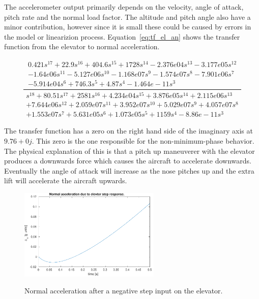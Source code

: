 The accelerometer output primarily depends on the velocity, angle of attack, pitch rate and the normal load factor. The altitude and pitch angle also have a minor contribution, however since it is small these could be caused by errors in the model or linearizion process. Equation~\ref{eq:tf_el_an} shows the transfer function from the elevator to normal acceleration.

\begin{equation}
    \label{eq:tf_el_an}
    \frac{
    \begin{matrix}
        0.421 s^{17} + 22.9 s^{16} + 404.6 s^{15} + 1728 s^{14} - 2.376e04 s^{13} - 3.177e05 s^{12} \\
        - 1.64e06 s^{11} - 5.127e06 s^{10} - 1.168e07 s^{9} - 1.574e07 s^{8} - 7.901e06 s^{7} \\
        - 5.914e04 s^{6} +  746.3 s^{5} + 4.87 s^{4} - 1.464e-11 s^{3}
    \end{matrix}
    }{
    \begin{matrix}
        s^{18} + 80.51 s^{17} + 2581 s^{16} + 4.234e04 s^{15} + 3.876e05 s^{14} + 2.115e06 s^{13} \\
        + 7.644e06 s^{12} + 2.059e07 s^{11} + 3.952e07 s^{10} + 5.029e07 s^{9} + 4.057e07 s^{8} \\
        + 1.553e07 s^{7} + 5.631e05 s^{6} + 1.073e05 s^{5} + 1159 s^{4} - 8.86e-11 s^{3}
    \end{matrix}
    }
\end{equation}

The transfer function has a zero on the right hand side of the imaginary axis at $9.76+0j$. This zero is the one responsible for the non-minimum-phase behavior. The physical explanation of this is that a pitch up maneuverer with the elevator produces a downwards force which causes the aircraft to accelerate downwards. Eventually the angle of attack will increase as the nose pitches up and the extra lift will accelerate the aircraft upwards.

\begin{figure}[ht]
    \centering
    \includegraphics[width=0.6\textwidth]{figures/an_elev_step}
    \label{fig:an_elev_step}
    \caption{Normal acceleration after a negative step input on the elevator.}
\end{figure}

